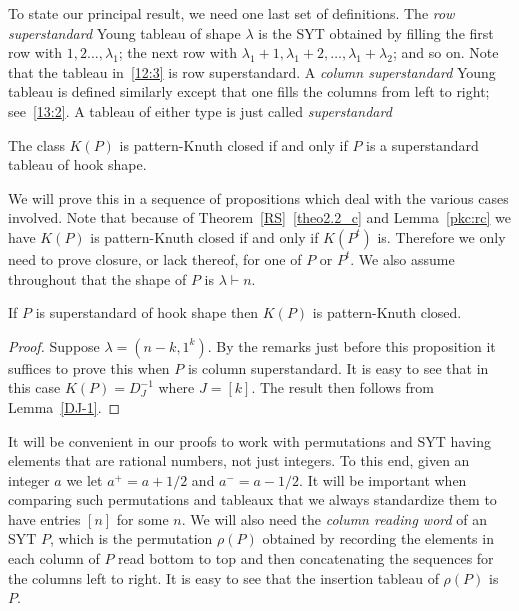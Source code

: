 \documentclass[ALCO,ThmDefs,Unicode,epreuves]{cedram}
\newcommand{\ptn}{\vdash}
\newcommand{\ree}[1]{\eqref{#1}}
\newcommand{\la}{\lambda}
\begin{document}
To state our principal result, we need one last set of definitions. The \emph{row superstandard} Young tableau of shape $\la$ is the SYT obtained by filling the first row with $1,2\dots,\la_1$; the next row with $\la_1+1,\la_1+2,\dots,\la_1+\la_2$; and so on. Note that the tableau in~\ree{12:3} is row superstandard. 
A \emph{column superstandard} Young tableau is defined similarly except that one fills the columns from left to right; see~\ree{13:2}. A tableau of either type is just called \emph{superstandard}


\begin{theo}
\label{pkc:main}
The class $K(P)$ is pattern-Knuth closed if and only if $P$ is a superstandard tableau of hook shape.
\end{theo}

We will prove this in a sequence of propositions which deal with the various cases involved. Note that because of Theorem~\ref{RS}~\eqref{theo2.2_c} and Lemma~\ref{pkc:rc} we have $K(P)$ is pattern-Knuth closed if and only if $K(P^t)$ is. Therefore we only need to prove closure, or lack thereof, for one of $P$ or $P^t$. We also assume throughout that the shape of $P$ is $\lambda\ptn n$.


\begin{prop}
\label{p:hook_closed}
If $P$ is superstandard of hook shape then $K(P)$ is pattern-Knuth closed.
\end{prop}
\begin{proof}
Suppose $\la=(n-k, 1^k)$. By the remarks just before this proposition it suffices to prove this when $P$ is column superstandard. It is easy to see that in this case $K(P)=D_J^{-1}$ where $J=[k]$. The result then follows from Lemma~\ref{DJ-1}.
\end{proof}

It will be convenient in our proofs to work with permutations and SYT having elements that are rational numbers, not just integers. To this end, given an integer $a$ we let $a^+= a + 1/2$ and $a^- = a - 1/2$. It will be important when comparing such permutations and tableaux that we always standardize them to have entries $[n]$ for some $n$. 
We will also need the \emph{column reading word} of an SYT $P$, which is the permutation $\rho(P)$ obtained by recording the elements in each column of $P$ read bottom to top and then concatenating the sequences for the columns left to right. It is easy to see that the insertion tableau of $\rho(P)$ is $P$.
\end{document}
